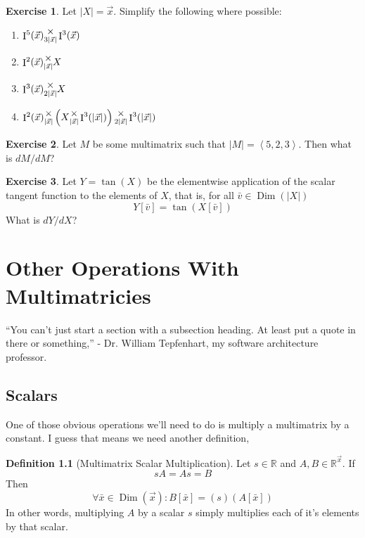\documentclass[12pt]{book}
\theoremstyle{definition}
\newtheorem{definition}{Definition}[chapter]
\newtheorem{exercise}{Exercise}[chapter]
\theoremstyle{plain}
\theoremstyle{ppart}
\theoremstyle{case}
\theoremstyle{solution}
\DeclareMathOperator{\Dim}{Dim}
\DeclareMathOperator{\Ident}{I}
\newcommand{\mmult}[1]{\text{\raisebox{1ex}{$\underset{#1}{\times}$}}}
\begin{document}
\begin{exercise}
Let $|X| = \vec{x}$. Simplify the following where possible:
\begin{enumerate}
\item $\Ident^5(\vec{x}) \mmult{3 |\vec{x}|} \Ident^3(\vec{x})$
\item $\Ident^2(\vec{x}) \mmult{|\vec{x}|} X$
\item $\Ident^3(\vec{x}) \mmult{2|\vec{x}|} X$
\item $\Ident^2(\vec{x}) \mmult{|\vec{x}|} \left(X \mmult{|\vec{x}|} \Ident^3(|\vec{x}|)
				\right) \mmult{2|\vec{x}|} \Ident^3(|\vec{x}|)$
\end{enumerate}
\end{exercise}

\begin{exercise}
Let $M$ be some multimatrix such that $|M| = \left<5,2,3\right>$. Then what is
$dM/dM$?
\end{exercise}

\begin{exercise}
Let $Y = \tan(X)$ be the elementwise application of the scalar tangent function to
the elements of $X$, that is, for all $\bar{v} \in \Dim(|X|)$
\[ Y[\bar{v}] = \tan(X[\bar{v}]) \]
What is $dY/dX$?
\end{exercise}

\chapter{Other Operations With Multimatricies}

\begin{displayquote}
``You can't just start a section with a subsection heading. At least put a quote
in there or something,'' - Dr. William Tepfenhart, my software architecture professor.
\end{displayquote}

\section{Scalars}

One of those obvious operations we'll need to do is multiply
a multimatrix by a constant. I guess that means we need another definition,

\begin{definition}[Multimatrix Scalar Multiplication]
Let $s \in \mathbb{R}$ and $A, B \in \mathbb{R}^{\vec{x}}$. If
\[ sA = As = B \]
Then
\[ \forall \bar{x} \in \Dim(\vec{x}):
   B[\bar{x}] = (s)(A[\bar{x}]) \]
In other words, multiplying $A$ by a scalar $s$ simply multiplies each of
it's elements by that scalar.
\end{definition}
\end{document}
